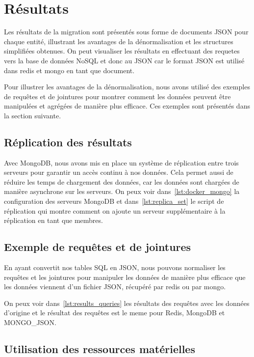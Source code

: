 \chapter{Résultats}
Les résultats de la migration sont présentés sous forme de documents JSON pour chaque entité, illustrant les avantages de la dénormalisation et les structures simplifiées obtenues. On peut visualiser les résultats en effectuant des requetes vers la base de données NoSQL et donc au JSON car le format JSON est utilisé dans redis et mongo en tant que document.

Pour illustrer les avantages de la dénormalisation, nous avons utilisé des exemples de requêtes et de jointures pour montrer comment les données peuvent être manipulées et agrégées de manière plus efficace. Ces exemples sont présentés dans la section suivante.

\section{Réplication des résultats}

Avec MongoDB, nous avons mis en place un système de réplication entre trois serveurs pour garantir un accès continu à nos données. Cela permet aussi de réduire les temps de chargement des données, car les données sont chargées de manière asynchrone sur les serveurs. On peux voir dans~\ref{lst:docker_mongo} la configuration des serveurs MongoDB et dans~\ref{lst:replica_set} le script de réplication qui montre comment on ajoute un serveur supplémentaire à la réplication en tant que membres.

\section{Exemple de requêtes et de jointures}

En ayant convertit nos tables SQL en JSON, nous pouvons normaliser les requêtes et les jointures pour manipuler les données de manière plus efficace que les données viennent d'un fichier JSON, récupéré par redis ou par mongo.

On peux voir dans~\ref{lst:results_queries} les résultats des requêtes avec les données d'origine et le résultat des requêtes est le meme pour Redis, MongoDB et MONGO\_JSON.\@

\section{Utilisation des ressources matérielles}

